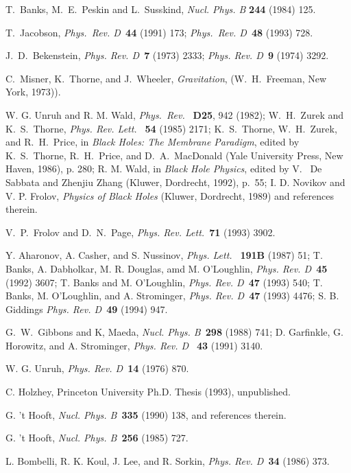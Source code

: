  T.~Banks, M.~E.~Peskin and L.~Susskind,
{\sl Nucl. Phys. B\/} {\bf 244} (1984) 125.

 T.~Jacobson, {\sl Phys.\ Rev. D\ }{\bf 44} (1991) 173; {\sl
Phys.\ Rev.  D\ }{\bf 48} (1993) 728.

 J.~D.~Bekenstein, {\sl Phys. Rev. D\ }{\bf 7} (1973) 2333; {\sl
Phys. Rev. D\ }{\bf 9} (1974) 3292.

 C.~Misner, K.~Thorne, and J.~Wheeler, {\it Gravitation},
(W.~H.~Freeman, New York, 1973)).

 W. G. Unruh and R. M. Wald, {\sl Phys.~Rev.\ }
 {\bf D25}, 942
 (1982); W.~H.~Zurek and K.~S.~Thorne, {\sl Phys. Rev. Lett.\ }{\bf
54} (1985) 2171; K.~S.~Thorne, W.~H.~Zurek, and R.~H.~Price, in {\it Black
Holes: The Membrane Paradigm}, edited by K.~S.~Thorne, R.~H.~Price, and
D.~A.~MacDonald (Yale University Press, New Haven, 1986), p. 280;
 R. M. Wald, in {\it Black Hole Physics}, edited by V.~
 De Sabbata and Zhenjiu Zhang (Kluwer, Dordrecht, 1992), p.~55;
 I. D. Novikov and V. P. Frolov, {\it Physics of Black
 Holes} (Kluwer, Dordrecht, 1989) and references therein.


 V.~P.~Frolov and D.~N.~Page, {\sl Phys. Rev. Lett.\ }{\bf 71}
(1993) 3902.

 Y. Aharonov, A. Casher, and S. Nussinov, {\sl Phys. Lett.\ }
{\bf 191B} (1987) 51; T. Banks, A. Dabholkar, M. R. Douglas, amd M.
O'Loughlin, {\sl Phys. Rev. D\ }{\bf 45} (1992) 3607; T. Banks and M.
O'Loughlin, {\sl Phys. Rev. D\ }{\bf 47} (1993) 540; T. Banks, M. O'Loughlin,
and A. Strominger, {\sl Phys. Rev. D\ }{\bf 47} (1993) 4476;
S. B. Giddings  {\sl Phys. Rev. D\ }{\bf 49} (1994) 947.

 G.~W.~Gibbons and K, Maeda, {\sl Nucl. Phys. B\ }{\bf 298}
(1988) 741; D. Garfinkle, G. Horowitz, and A. Strominger,
{\sl Phys. Rev. D\ }
{\bf 43} (1991) 3140.

 W. G. Unruh, {\sl Phys. Rev. D\ }{\bf 14} (1976) 870.

 C. Holzhey, Princeton University Ph.D. Thesis (1993),
unpublished.

 G. 't Hooft, {\sl Nucl. Phys. B\ }{\bf 335} (1990) 138, and
references therein.

 G. 't Hooft, {\sl Nucl. Phys. B\ }{\bf 256} (1985) 727.

 L. Bombelli, R. K. Koul, J. Lee, and R. Sorkin, {\sl Phys.
Rev. D\ }{\bf 34} (1986) 373.

